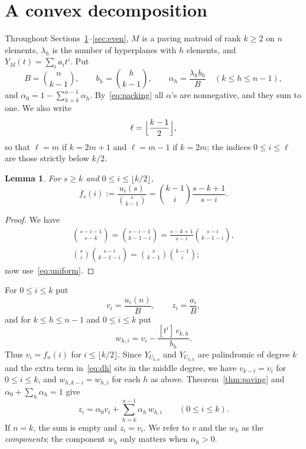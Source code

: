 \documentclass[11pt]{amsart}
\newtheorem{lemma}[theorem]{Lemma}
\theoremstyle{definition}
\theoremstyle{remark}
\numberwithin{equation}{section}
\begin{document}
\section{A convex decomposition}\label{sec:decomposition}

Throughout Sections~\ref{sec:decomposition}--\ref{sec:even}, $M$ is a paving matroid of rank $k\ge2$ on $n$ elements, $\lambda_h$ is the number of hyperplanes with $h$ elements, and $Y_M(t)=\sum_i a_it^i$. Put
\[
B=\binom{n}{k-1},\qquad b_h=\binom{h}{k-1},\qquad
\alpha_h=\frac{\lambda_hb_h}{B}\quad(k\le h\le n-1),
\]
and $\alpha_0=1-\sum_{h=k}^{n-1}\alpha_h$.
By~\eqref{eq:packing} all $\alpha$'s are nonnegative, and they sum to one. We also write
\[
\ell=\Bigl\lfloor\frac{k-1}{2}\Bigr\rfloor,
\]
so that $\ell=m$ if $k=2m+1$ and $\ell=m-1$ if $k=2m$; the indices $0\le i\le\ell$ are those strictly below $k/2$.

\begin{lemma}\label{lem:normalized}
For $s\ge k$ and $0\le i\le\lfloor k/2\rfloor$,
\[
f_s(i):=\frac{u_i(s)}{\binom{s}{k-1}}=\binom{k-1}{i}\frac{s-k+1}{s-i}.
\]
\end{lemma}

\begin{proof}
We have
\begin{gather*}
\binom{s-i-1}{s-k}=\binom{s-i-1}{k-1-i}=\frac{s-k+1}{s-i}\binom{s-i}{k-1-i},\\
\binom{s}{i}\binom{s-i}{k-1-i}=\binom{s}{k-1}\binom{k-1}{i};
\end{gather*}
now use~\eqref{eq:uniform}.
\end{proof}

For $0\le i\le k$ put
\[
v_i=\frac{u_i(n)}{B},\qquad z_i=\frac{a_i}{B},
\]
and for $k\le h\le n-1$ and $0\le i\le k$ put
\[
w_{h,i}=v_i-\frac{[t^i]\,c_{k,h}}{b_h}.
\]
Thus $v_i=f_n(i)$ for $i\le\lfloor k/2\rfloor$. Since $Y_{U_{k,n}}$ and $Y_{U_{k,h}}$ are palindromic of degree $k$ and the extra term in~\eqref{eq:dh} sits in the middle degree, we have $v_{k-i}=v_i$ for $0\le i\le k$, and $w_{h,k-i}=w_{h,i}$ for each $h$ as above. Theorem~\ref{thm:paving} and $\alpha_0+\sum_h\alpha_h=1$ give
\begin{equation}\label{eq:mixture}
z_i=\alpha_0v_i+\sum_{h=k}^{n-1}\alpha_h\,w_{h,i}\qquad(0\le i\le k).
\end{equation}
If $n=k$, the sum is empty and $z_i=v_i$.
We refer to $v$ and the $w_h$ as the \emph{components}; the component $w_h$ only matters when $\alpha_h>0$.
\end{document}

